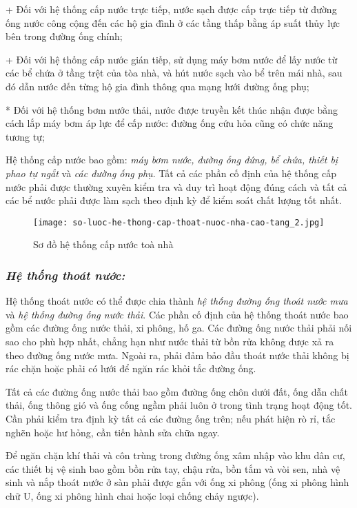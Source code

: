 	+ Đối với hệ thống cấp nước trực tiếp, nước sạch được cấp trực tiếp từ đường ống nước công cộng đến các hộ gia đình ở các tầng thấp bằng áp suất thủy lực bên trong đường ống chính;
	
	+ Đối với hệ thống cấp nước gián tiếp, sử dụng máy bơm nước để lấy nước từ các bể chứa ở tầng trệt của tòa nhà, và hút nước sạch vào bể trên mái nhà, sau đó dẫn nước đến từng hộ gia đình thông qua mạng lưới đường ống phụ;
		
	* Đối với hệ thống bơm nước thải, nước được truyền kết thúc nhận được bằng cách lắp máy bơm áp lực để cấp nước: đường ống cứu hỏa cũng có chức năng tương tự;
	
	Hệ thống cấp nước bao gồm: \emph{máy bơm nước, đường ống đứng, bể chứa, thiết bị phao tự ngắt} và \emph{các đường ống phụ}. Tất cả các phần cố định của hệ thống cấp nước phải được thường xuyên kiểm tra và duy trì hoạt động đúng cách và tất cả các bể nước phải được làm sạch theo định kỳ để kiểm soát chất lượng tốt nhất.
	\begin{figure}[H]
		\centering
		\texttt{[image: so-luoc-he-thong-cap-thoat-nuoc-nha-cao-tang\_2.jpg]}	
		\caption{Sơ đồ hệ thống cấp nước toà nhà}
	\end{figure}
	
	\subsubsection{\emph{Hệ thống thoát nước:}}
	Hệ thống thoát nước có thể được chia thành \emph{hệ thống đường ống thoát nước mưa} và \emph{hệ thống đường ống nước thải}. Các phần cố định của hệ thống thoát nước bao gồm các đường ống nước thải, xi phông, hố ga. Các đường ống nước thải phải nối sao cho phù hợp nhất, chẳng hạn như nước thải từ bồn rửa không được xả ra theo đường ống nước mưa. Ngoài ra, phải đảm bảo đầu thoát nước thải không bị rác chặn hoặc phải có lưới để ngăn  rác khỏi tắc đường ống.
	
	Tất cả các đường ống nước thải bao gồm đường ống chôn dưới đất, ống dẫn chất thải, ống thông gió và ống cống ngầm phải luôn ở trong tình trạng hoạt động tốt. Cần phải kiểm tra định kỳ tất cả các đường ống trên; nếu phát hiện rò rỉ, tắc nghẽn hoặc hư hỏng, cần tiến hành sửa chữa ngay.
	
	Để ngăn chặn khí thải và côn trùng trong đường ống xâm nhập vào khu dân cư, các thiết bị vệ sinh bao gồm bồn rửa tay, chậu rửa, bồn tắm và vòi sen, nhà vệ sinh và nắp thoát nước ở sàn phải được gắn với ống xi phông (ống xi phông hình chữ U, ống xi phông hình chai hoặc loại chống chảy ngược).
	
